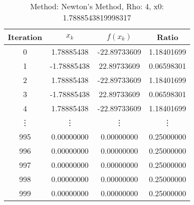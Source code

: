 \begin{table}
\centering
\caption{Method: Newton's Method, Rho: 4, x0: 1.7888543819998317}
\label{tab:table_Newton's_Method_4_1_7888543819998317}
\begin{tabular}{c c c c}
\toprule
Iteration &       $x_k$ &     $f(x_k)$ &      Ratio \\
\midrule
        0 &  1.78885438 & -22.89733609 & 1.18401699 \\
        1 & -1.78885438 &  22.89733609 & 0.06598301 \\
        2 &  1.78885438 & -22.89733609 & 1.18401699 \\
        3 & -1.78885438 &  22.89733609 & 0.06598301 \\
        4 &  1.78885438 & -22.89733609 & 1.18401699 \\
   \vdots &      \vdots &       \vdots &     \vdots \\
      995 &  0.00000000 &   0.00000000 & 0.25000000 \\
      996 &  0.00000000 &   0.00000000 & 0.25000000 \\
      997 &  0.00000000 &   0.00000000 & 0.25000000 \\
      998 &  0.00000000 &   0.00000000 & 0.25000000 \\
      999 &  0.00000000 &   0.00000000 & 0.25000000 \\
\bottomrule
\end{tabular}
\end{table}
